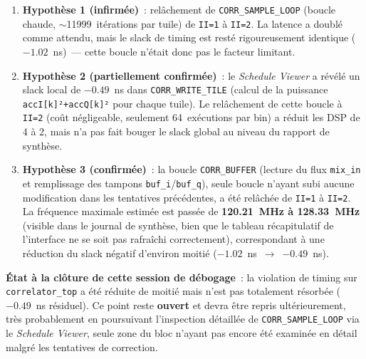 \documentclass[11pt,a4paper]{article}
\begin{document}
\begin{enumerate}
  \item \textbf{Hypothèse 1 (infirmée)}~: relâchement de \texttt{CORR\_SAMPLE\_LOOP} (boucle chaude, $\sim$11999~itérations par tuile) de \texttt{II=1} à \texttt{II=2}. La latence a doublé comme attendu, mais le slack de timing est resté rigoureusement identique ($-1.02$~ns)~--- cette boucle n'était donc pas le facteur limitant.
  \item \textbf{Hypothèse 2 (partiellement confirmée)}~: le \textit{Schedule Viewer} a révélé un slack local de $-0.49$~ns dans \texttt{CORR\_WRITE\_TILE} (calcul de la puissance \texttt{accI[k]²+accQ[k]²} pour chaque tuile). Le relâchement de cette boucle à \texttt{II=2} (coût négligeable, seulement 64~exécutions par bin) a réduit les DSP de 4 à 2, mais n'a pas fait bouger le slack global au niveau du rapport de synthèse.
  \item \textbf{Hypothèse 3 (confirmée)}~: la boucle \texttt{CORR\_BUFFER} (lecture du flux \texttt{mix\_in} et remplissage des tampons \texttt{buf\_i}/\texttt{buf\_q}), seule boucle n'ayant subi aucune modification dans les tentatives précédentes, a été relâchée de \texttt{II=1} à \texttt{II=2}. La fréquence maximale estimée est passée de \textbf{120.21~MHz à 128.33~MHz} (visible dans le journal de synthèse, bien que le tableau récapitulatif de l'interface ne se soit pas rafraîchi correctement), correspondant à une réduction du slack négatif d'environ moitié ($-1.02$~ns~$\to$~$-0.49$~ns).
\end{enumerate}

\textbf{État à la clôture de cette session de débogage}~: la violation de timing sur \texttt{correlator\_top} a été réduite de moitié mais n'est pas totalement résorbée ($-0.49$~ns résiduel). Ce point reste \textbf{ouvert} et devra être repris ultérieurement, très probablement en poursuivant l'inspection détaillée de \texttt{CORR\_SAMPLE\_LOOP} via le \textit{Schedule Viewer}, seule zone du bloc n'ayant pas encore été examinée en détail malgré les tentatives de correction.
\end{document}
